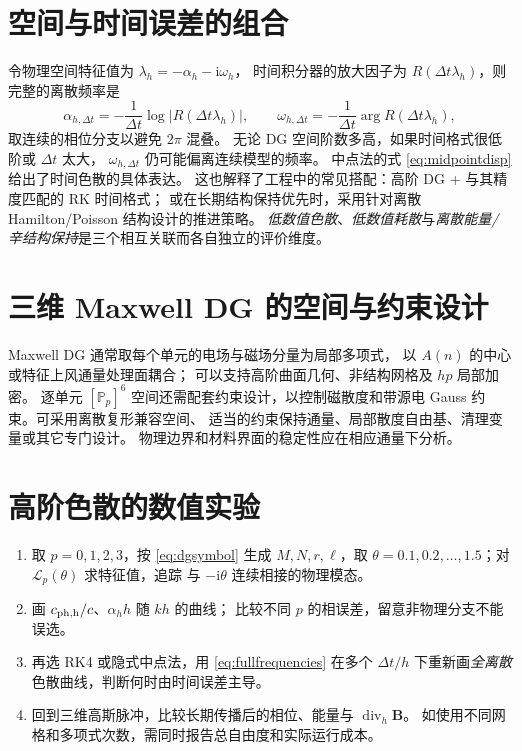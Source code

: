 \documentclass[UTF8,11pt,openany]{ctexbook}
\numberwithin{equation}{chapter}
\theoremstyle{definition}
\theoremstyle{remark}
\newcommand{\Div}{\operatorname{div}}
\begin{document}
\section{空间与时间误差的组合}
令物理空间特征值为 $\lambda_h=-\alpha_h-\mathrm i\omega_h$，
时间积分器的放大因子为 $R(\Delta t\lambda_h)$，则完整的离散频率是
\begin{equation}\label{eq:fullfrequencies}
\alpha_{h,\Delta t}=-\frac1{\Delta t}\log|R(\Delta t\lambda_h)|,
\qquad
\omega_{h,\Delta t}=-\frac1{\Delta t}\arg R(\Delta t\lambda_h),
\end{equation}
取连续的相位分支以避免 $2\pi$ 混叠。
无论 DG 空间阶数多高，如果时间格式很低阶或 $\Delta t$ 太大，
$\omega_{h,\Delta t}$ 仍可能偏离连续模型的频率。
中点法的式 \eqref{eq:midpointdisp} 给出了时间色散的具体表达。
这也解释了工程中的常见搭配：高阶 DG + 与其精度匹配的 RK 时间格式；
或在长期结构保持优先时，采用针对离散 Hamilton/Poisson 结构设计的推进策略。
\emph{低数值色散}、\emph{低数值耗散}与\emph{离散能量/辛结构保持}是三个相互关联而各自独立的评价维度。

\section{三维 Maxwell DG 的空间与约束设计}
Maxwell DG 通常取每个单元的电场与磁场分量为局部多项式，
以 $A(n)$ 的中心或特征上风通量处理面耦合；
可以支持高阶曲面几何、非结构网格及 $hp$ 局部加密。
逐单元 $[\mathbb P_p]^6$ 空间还需配套约束设计，以控制磁散度和带源电 Gauss 约束。可采用离散复形兼容空间、
适当的约束保持通量、局部散度自由基、清理变量或其它专门设计。
物理边界和材料界面的稳定性应在相应通量下分析。

\section{高阶色散的数值实验}
\begin{enumerate}
\item 取 $p=0,1,2,3$，按 \eqref{eq:dgsymbol} 生成 $M,N,r,\ell$，取
$\theta=0.1,0.2,\ldots,1.5$；对 $\mathcal L_p(\theta)$ 求特征值，追踪
与 $-\mathrm i\theta$ 连续相接的物理模态。
\item 画 $c_{\rm ph,h}/c$、$\alpha_hh$ 随 $kh$ 的曲线；
比较不同 $p$ 的相误差，留意非物理分支不能误选。
\item 再选 RK4 或隐式中点法，用 \eqref{eq:fullfrequencies} 在多个
$\Delta t/h$ 下重新画\emph{全离散}色散曲线，判断何时由时间误差主导。
\item 回到三维高斯脉冲，比较长期传播后的相位、能量与 $\Div_h\bm B$。
如使用不同网格和多项式次数，需同时报告总自由度和实际运行成本。
\end{enumerate}
\end{document}
